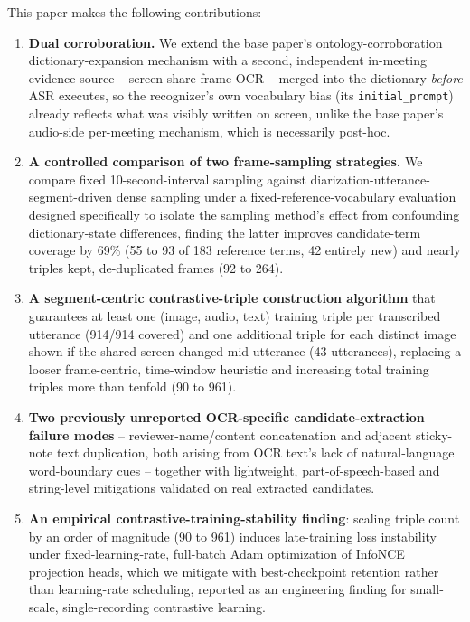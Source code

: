 ﻿\documentclass[twocolumn]{article}
\begin{document}
This paper makes the following contributions:
\begin{enumerate}[leftmargin=*,itemsep=1pt]
  \item \textbf{Dual corroboration.} We extend the base paper's ontology-corroboration
    dictionary-expansion mechanism with a second, independent in-meeting evidence source --
    screen-share frame OCR -- merged into the dictionary \emph{before} ASR executes, so the
    recognizer's own vocabulary bias (its \texttt{initial\_prompt}) already reflects what was
    visibly written on screen, unlike the base paper's audio-side per-meeting mechanism, which is
    necessarily post-hoc.
  \item \textbf{A controlled comparison of two frame-sampling strategies.} We compare fixed
    10-second-interval sampling against diarization-utterance-segment-driven dense sampling under a
    fixed-reference-vocabulary evaluation designed specifically to isolate the sampling method's
    effect from confounding dictionary-state differences, finding the latter improves candidate-term
    coverage by 69\% (55 to 93 of 183 reference terms, 42 entirely new) and nearly triples kept,
    de-duplicated frames (92 to 264).
  \item \textbf{A segment-centric contrastive-triple construction algorithm} that guarantees at
    least one (image, audio, text) training triple per transcribed utterance (914/914 covered) and
    one additional triple for each distinct image shown if the shared screen changed mid-utterance
    (43 utterances), replacing a looser frame-centric, time-window heuristic and increasing total
    training triples more than tenfold (90 to 961).
  \item \textbf{Two previously unreported OCR-specific candidate-extraction failure modes} --
    reviewer-name/content concatenation and adjacent sticky-note text duplication, both arising from
    OCR text's lack of natural-language word-boundary cues -- together with lightweight,
    part-of-speech-based and string-level mitigations validated on real extracted candidates.
  \item \textbf{An empirical contrastive-training-stability finding}: scaling triple count by an
    order of magnitude (90 to 961) induces late-training loss instability under fixed-learning-rate,
    full-batch Adam optimization of InfoNCE projection heads, which we mitigate with best-checkpoint
    retention rather than learning-rate scheduling, reported as an engineering finding for
    small-scale, single-recording contrastive learning.

\end{enumerate}
\end{document}
